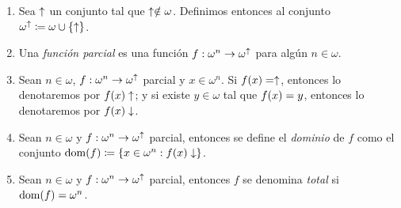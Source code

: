 \begin{definition}
	\begin{enumerate}
		\item Sea $\uparrow$ un conjunto tal que $\uparrow\notin\omega$. Definimos entonces al conjunto $\omega^{\uparrow}\coloneqq\omega\cup\{\uparrow\}$.

		\item Una \emph{función parcial} es una función $f:\omega^{n}\to\omega^{\uparrow}$ para algún $n\in\omega$.

		\item Sean $n\in\omega$, $f:\omega^{n}\to\omega^{\uparrow}$ parcial y $x\in\omega^{n}$. Si $f\pa*{x} =\DIVERGE$, entonces lo denotaremos por $f\pa*{x}\DIVERGE$; y si existe $y\in\omega$ tal que $f\pa*{x} = y$, entonces lo denotaremos por $f\pa*{x}\ACABA$.

		\item Sean $n\in\omega$ y $f:\omega^{n}\to\omega^{\uparrow}$ parcial, entonces se define el \emph{dominio} de $f$ como el conjunto $\DOMINIO{f}\coloneqq\{x\in\omega^{n}: f\pa*{x}\ACABA\}$.

		\item Sean $n\in\omega$ y $f:\omega^{n}\to\omega^{\uparrow}$ parcial, entonces $f$ se denomina \emph{total} si $\DOMINIO{f} =\omega^{n}$.
	\end{enumerate}
\end{definition}

